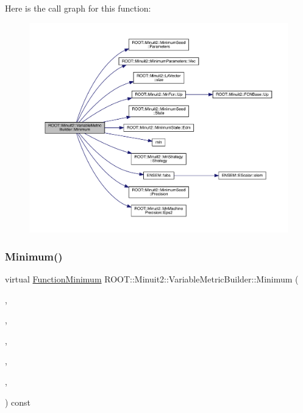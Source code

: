 Here is the call graph for this function\+:
\nopagebreak
\begin{figure}[H]
\begin{center}
\leavevmode
\includegraphics[width=350pt]{d5/d52/classROOT_1_1Minuit2_1_1VariableMetricBuilder_a56d18a37b8643611ff80875b91915784_cgraph}
\end{center}
\end{figure}
\mbox{\label{classROOT_1_1Minuit2_1_1VariableMetricBuilder_af39ef2e38ec2bf3d94fa78fe0ed9a64a}} 
\subsubsection{\texorpdfstring{Minimum()}{Minimum()}\hspace{0.1cm}{\footnotesize\ttfamily [2/6]}}
{\footnotesize\ttfamily virtual \mbox{\hyperlink{classROOT_1_1Minuit2_1_1FunctionMinimum}{Function\+Minimum}} R\+O\+O\+T\+::\+Minuit2\+::\+Variable\+Metric\+Builder\+::\+Minimum (\begin{DoxyParamCaption}\item[{const \mbox{\hyperlink{classROOT_1_1Minuit2_1_1MnFcn}{Mn\+Fcn}} \&}]{,  }\item[{const \mbox{\hyperlink{classROOT_1_1Minuit2_1_1GradientCalculator}{Gradient\+Calculator}} \&}]{,  }\item[{const \mbox{\hyperlink{classROOT_1_1Minuit2_1_1MinimumSeed}{Minimum\+Seed}} \&}]{,  }\item[{const \mbox{\hyperlink{classROOT_1_1Minuit2_1_1MnStrategy}{Mn\+Strategy}} \&}]{,  }\item[{unsigned int}]{,  }\item[{double}]{ }\end{DoxyParamCaption}) const\hspace{0.3cm}{\ttfamily [virtual]}}



